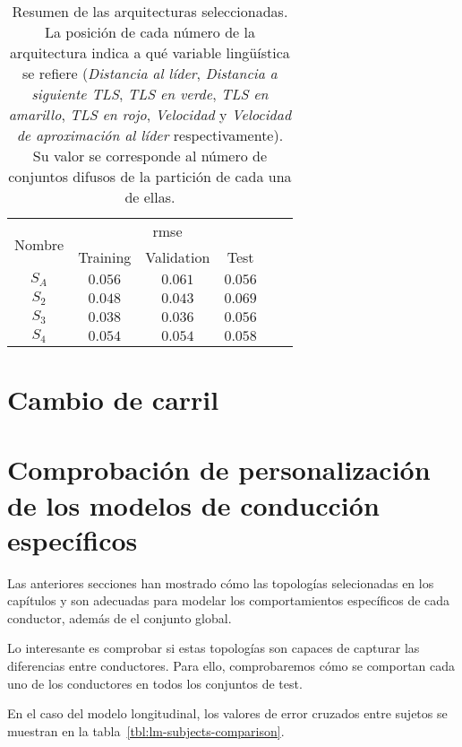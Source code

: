 \begin{table}
	\centering
	\caption[Resumen de las arquitecturas \ac{fcs} para el modelo longitudinal]{Resumen de las arquitecturas seleccionadas. La posición de cada número de la arquitectura indica a qué variable lingüística se refiere (\textit{Distancia al líder}, \textit{Distancia a siguiente TLS}, \textit{TLS en verde}, \textit{TLS en amarillo}, \textit{TLS en rojo}, \textit{Velocidad} y \textit{Velocidad de aproximación al líder} respectivamente). Su valor se corresponde al número de conjuntos difusos de la partición de cada una de ellas.}
	\label{tbl:lm-specific-rmse}
	\begin{tabular}{cccccc}
		\hline
		\multirow{2}{*}{Nombre} & \multicolumn{3}{c}{\ac{rmse}}      \\ 
		& Training & Validation & Test \\ \hline
		$S_A$ & $0.056$ & $0.061$ & $0.056$  \\
		$S_2$ & $0.048$ & $0.043$ & $0.069$  \\
		$S_3$ & $0.038$ & $0.036$ & $0.056$  \\
		$S_4$ & $0.054$ & $0.054$ & $0.058$  \\ \hline
	\end{tabular}
\end{table}


\section{Cambio de carril}

\section{Comprobación de personalización de los modelos de conducción específicos}

Las anteriores secciones han mostrado cómo las topologías selecionadas en los capítulos  y  son adecuadas para modelar los comportamientos específicos de cada conductor, además de el conjunto global.

Lo interesante es comprobar si estas topologías son capaces de capturar las diferencias entre conductores. Para ello, comprobaremos cómo se comportan cada uno de los conductores en todos los conjuntos de test.

En el caso del modelo longitudinal, los valores de error cruzados entre sujetos se muestran en la tabla~\ref{tbl:lm-subjects-comparison}.

